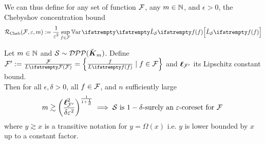 





\begin{tcolorbox}[colback=red!75, title=Useless?]
	
	We can thus define for any set of function $\mathcal{F}$, any $m\in \mathbb{N}$, and $\epsilon>0$, the Chebyshov concentration bound
	\begin{equation*}
		\boundrate_{\textrm{Cheb}}(\qset, \epsilon, m) := \frac{1}{\epsilon^2} \sup_{\query \in \qset} \Var{}{\estloss{\mathcal{S}}{\query}}
	\end{equation*}
	
	
	\begin{tcolorbox}
		\begin{theorem}
			Let $m\in \mathbb{N}$ and $\mathcal{S} \sim  \mathcal{DPP}(\tilde{\boldsymbol K}_{m})$. 
			Define $\qset':=\frac{\qset}{\loss{\qset}}=\left\{\frac{\query}{\loss{\query}}\mid \query \in \qset\right\}$ and $\boldsymbol\ell_{\mathcal{F}'}$ its Lipschitz constant bound.\\
	
			Then for all $\epsilon, \delta >0$, all $f \in \mathcal{F}$, and $n$ sufficiently large
			\begin{equation}
				m \gtrsim \left(\frac{\boldsymbol\ell^2_{\mathcal{F}'}}{\delta\varepsilon^2} \right)^{\frac{1}{1+\frac 1 d}} \implies \text{$\mathcal{S}$ is $1-\delta$-surely an $\varepsilon$-coreset for $\mathcal{F}$ }
			\end{equation}
			where $y \gtrsim x$ is a transitive notation for $y = \Omega(x)$ i.e. $y$ is lower bounded by $x$ up to a constant factor.
		\end{theorem}
	\end{tcolorbox}
	

\end{tcolorbox}
